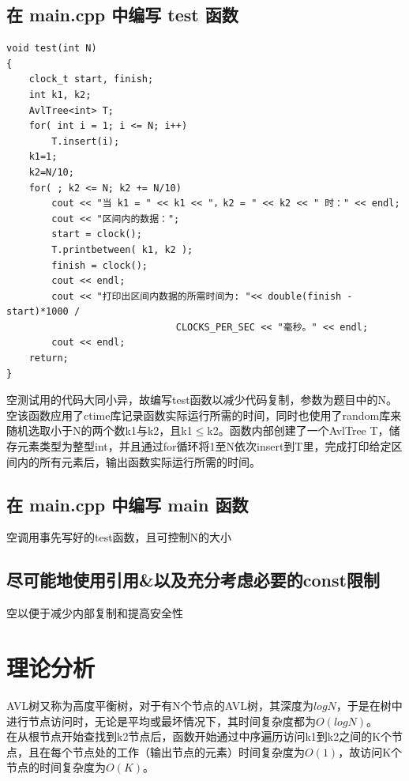 \documentclass[UTF8]{ctexart}
\begin{document}
\subsection{在 main.cpp 中编写 test 函数}

\begin{lstlisting}[language={[ANSI]C++}]
void test(int N) 
{
    clock_t start, finish;
    int k1, k2;
    AvlTree<int> T;
    for( int i = 1; i <= N; i++)
        T.insert(i);
    k1=1;
    k2=N/10;
    for( ; k2 <= N; k2 += N/10)
        cout << "当 k1 = " << k1 << "，k2 = " << k2 << " 时：" << endl;
        cout << "区间内的数据：";
        start = clock();
        T.printbetween( k1, k2 );
        finish = clock();
        cout << endl;
        cout << "打印出区间内数据的所需时间为: "<< double(finish - start)*1000 / 
                              CLOCKS_PER_SEC << "毫秒。" << endl;
        cout << endl;
    return;
}
\end{lstlisting}

\hphantom 空测试用的代码大同小异，故编写test函数以减少代码复制，参数为题目中的N。\\

\hphantom 空该函数应用了ctime库记录函数实际运行所需的时间，同时也使用了random库来随机选取小于N的两个数k1与k2，且k1$≤$k2。函数内部创建了一个AvlTree T，储存元素类型为整型int，并且通过for循环将1至N依次insert到T里，完成打印给定区间内的所有元素后，输出函数实际运行所需的时间。

\subsection{在 main.cpp 中编写 main 函数}
\hphantom 空调用事先写好的test函数，且可控制N的大小

\subsection{尽可能地使用引用\&以及充分考虑必要的const限制}
\hphantom 空以便于减少内部复制和提高安全性

\section{理论分析}

AVL树又称为高度平衡树，对于有N个节点的AVL树，其深度为$logN$，于是在树中进行节点访问时，无论是平均或最坏情况下，其时间复杂度都为$O(logN)$。\\

在从根节点开始查找到k2节点后，函数开始通过中序遍历访问k1到k2之间的K个节点，且在每个节点处的工作（输出节点的元素）时间复杂度为$O(1)$，故访问K个节点的时间复杂度为$O(K)$。\\
\end{document}
